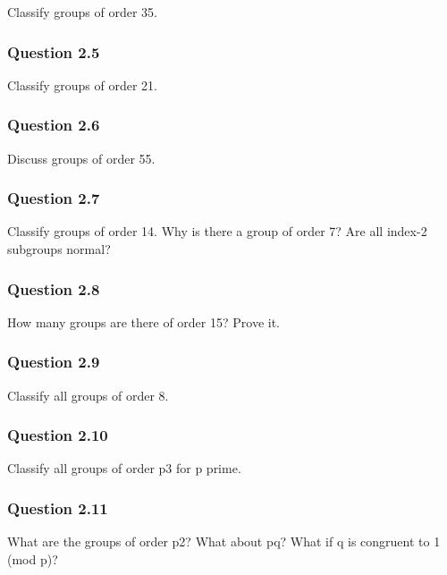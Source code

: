 Classify groups of order 35.

\hypertarget{question-2.5}{%
\subsubsection{Question 2.5}\label{question-2.5}}

Classify groups of order 21.

\hypertarget{question-2.6}{%
\subsubsection{Question 2.6}\label{question-2.6}}

Discuss groups of order 55.

\hypertarget{question-2.7}{%
\subsubsection{Question 2.7}\label{question-2.7}}

Classify groups of order 14. Why is there a group of order 7? Are all
index-2 subgroups normal?

\hypertarget{question-2.8}{%
\subsubsection{Question 2.8}\label{question-2.8}}

How many groups are there of order 15? Prove it.

\hypertarget{question-2.9}{%
\subsubsection{Question 2.9}\label{question-2.9}}

Classify all groups of order 8.

\hypertarget{question-2.10}{%
\subsubsection{Question 2.10}\label{question-2.10}}

Classify all groups of order p3 for p prime.

\hypertarget{question-2.11}{%
\subsubsection{Question 2.11}\label{question-2.11}}

What are the groups of order p2? What about pq? What if q is congruent
to 1 (mod p)?

